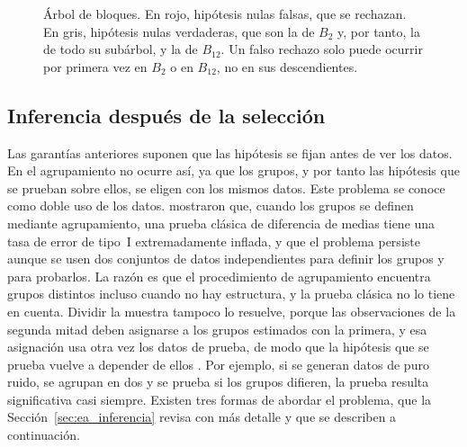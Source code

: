 \begin{figure}[ht]
  \centering
  \caption{Árbol de bloques. En rojo, hipótesis nulas falsas, que se rechazan. En
  gris, hipótesis nulas verdaderas, que son la de $B_2$ y, por tanto, la de todo su subárbol, y la de $B_{12}$. Un falso rechazo solo puede ocurrir por primera vez en $B_2$ o en $B_{12}$, no en sus descendientes.}
  \label{fig:subarboles-nulos}
\end{figure}

\subsection{Inferencia después de la selección}\label{sec:est-seleccion}

Las garantías anteriores suponen que las hipótesis se fijan antes de ver los
datos. En el agrupamiento no ocurre así, ya que los grupos, y por tanto las
hipótesis que se prueban sobre ellos, se eligen con los mismos datos. Este
problema se conoce como doble uso de los datos. \citet{Gao2024} mostraron que, cuando los grupos
se definen mediante agrupamiento, una prueba clásica de diferencia de medias
tiene una tasa de error de tipo~I extremadamente inflada, y que el problema
persiste aunque se usen dos conjuntos de datos independientes para definir los
grupos y para probarlos. La razón es que el procedimiento de agrupamiento
encuentra grupos distintos incluso cuando no hay estructura, y la prueba clásica no lo tiene en cuenta. Dividir la muestra tampoco lo resuelve, porque las observaciones de la segunda mitad deben asignarse a los grupos estimados con la primera, y esa asignación usa otra vez los datos de prueba, de modo que la hipótesis que se prueba vuelve a depender de ellos \citep{Gao2024}. Por ejemplo, si se generan datos de puro ruido, se agrupan en dos y se prueba si los grupos difieren, la prueba resulta significativa casi siempre. Existen tres
formas de abordar el problema, que la Sección~\ref{sec:ea_inferencia} revisa con
más detalle y que se describen a continuación.

